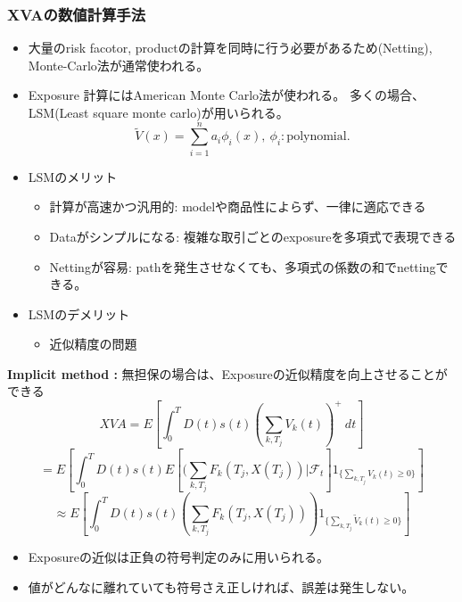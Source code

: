 \documentclass[driverfallback=dvipdfmx,cjk]{beamer}
\begin{document}
\begin{frame} \frametitle{XVAの数値計算手法}
    \begin{itemize}
        \item 大量のrisk facotor, productの計算を同時に行う必要があるため(Netting), Monte-Carlo法が通常使われる。
        \item Exposure 計算にはAmerican Monte Carlo法が使われる。
            多くの場合、LSM(Least square monte carlo)が用いられる。
            $$ \tilde{V}(x) = \sum_{i=1}^n a_i \phi_i(x), \ \phi_i: \text{polynomial}.$$
        \item LSMのメリット
        \begin{itemize}
            \item 計算が高速かつ汎用的: modelや商品性によらず、一律に適応できる
            \item Dataがシンプルになる: 複雑な取引ごとのexposureを多項式で表現できる
            \item Nettingが容易: pathを発生させなくても、多項式の係数の和でnettingできる。
        \end{itemize}
    \item LSMのデメリット
        \begin{itemize}
            \item 近似精度の問題
        \end{itemize}
    \end{itemize}
\end{frame}

\begin{frame}
\textbf{Implicit method :}
無担保の場合は、Exposureの近似精度を向上させることができる
$$ XVA = E[\int_0^T D(t)s(t)(\sum_{k , T_j}V_k(t))^+ \ dt] $$
$$ = E[ \int_0^T D(t) s(t) E [(\sum_{k , T_j} F_k(T_j, X(T_j)) | \mathcal{F}_t] 1_{\{\sum_{k , T_j} V_k(t) \ge 0 \}} ] $$
$$\approx E[ \int_0^T D(t) s(t) (\sum_{k , T_j} F_k(T_j, X(T_j)) ) 1_{\{\sum_{k , T_j} \tilde{V}_k(t) \ge 0 \}} ] $$
\begin{itemize}
    \item Exposureの近似は正負の符号判定のみに用いられる。
    \item 値がどんなに離れていても符号さえ正しければ、誤差は発生しない。
\end{itemize}
\end{frame}
\end{document}
